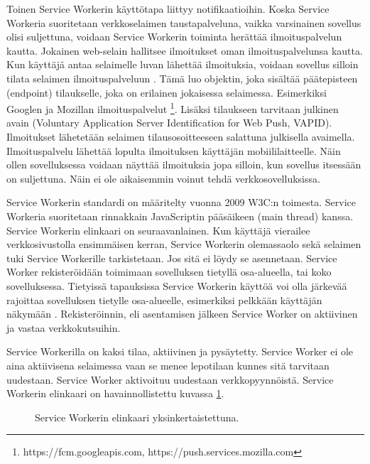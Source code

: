 \documentclass{tktltiki}
\begin{document}
Toinen Service Workerin käyttötapa liittyy notifikaatioihin. Koska Service Workeria suoritetaan verkkoselaimen taustapalveluna, vaikka varsinainen sovellus olisi suljettuna, voidaan Service Workerin toiminta herättää ilmoituspalvelun kautta. Jokainen web-selain hallitsee ilmoitukset oman ilmoituspalvelunsa kautta. Kun käyttäjä antaa selaimelle luvan lähettää ilmoituksia, voidaan sovellus silloin tilata selaimen ilmoituspalveluun \cite{Googleb}. Tämä luo objektin, joka sisältää päätepisteen (endpoint) tilaukselle, joka on erilainen jokaisessa selaimessa. Esimerkiksi Googlen ja Mozillan ilmoituspalvelut \footnote{https://fcm.googleapis.com, https://push.services.mozilla.com}. Lisäksi tilaukseen tarvitaan julkinen avain (Voluntary Application Server Identification for Web Push, VAPID). Ilmoitukset lähetetään selaimen tilausosoitteeseen salattuna julkisella avaimella. Ilmoituspalvelu lähettää lopulta ilmoituksen käyttäjän mobiililaitteelle. Näin ollen sovelluksessa voidaan näyttää ilmoituksia jopa silloin, kun sovellus itsessään on suljettuna. Näin ei ole aikaisemmin voinut tehdä verkkosovelluksissa.

Service Workerin standardi on määritelty vuonna 2009 W3C:n toimesta. Service Workeria suoritetaan rinnakkain JavaScriptin pääsäikeen (main thread) kanssa. Service Workerin elinkaari on seuraavanlainen. Kun käyttäjä vierailee verkkosivustolla ensimmäisen kerran, Service Workerin olemassaolo sekä selaimen tuki Service Workerille tarkistetaan. Jos sitä ei löydy se asennetaan. Service Worker rekisteröidään toimimaan sovelluksen tietyllä osa-alueella, tai koko sovelluksessa. Tietyissä tapauksissa Service Workerin käyttöä voi olla järkevää rajoittaa sovelluksen tietylle osa-alueelle, esimerkiksi pelkkään käyttäjän näkymään \cite{hiltunen2018creating}. Rekisteröinnin, eli asentamisen jälkeen Service Worker on aktiivinen ja vastaa verkkokutsuihin. 

Service Workerilla on kaksi tilaa, aktiivinen ja pysäytetty. Service Worker ei ole aina aktiivisena selaimessa vaan se menee lepotilaan kunnes sitä tarvitaan uudestaan. Service Worker aktivoituu uudestaan verkkopyynnöistä. Service Workerin elinkaari on havainnollistettu kuvassa \ref{Service workerin elinkaari}.

\begin{figure}[!htbp]
\begin{center}
\caption{Service Workerin elinkaari yksinkertaistettuna. }
\label{Service workerin elinkaari}
\end{center}
\end{figure}
\end{document}
